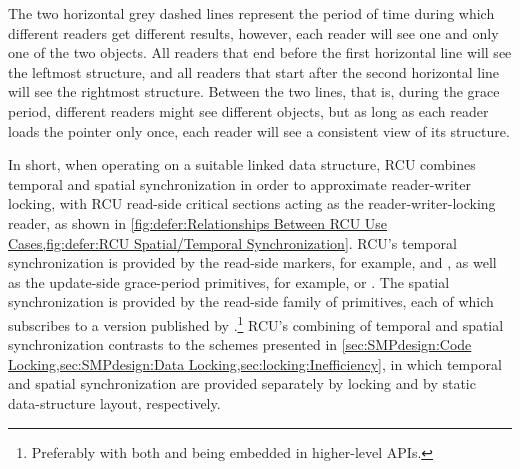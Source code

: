 The two horizontal grey dashed lines represent the period of time during
which different readers get different results, however, each reader
will see one and only one of the two objects.
All readers that end before the first horizontal line will see the
leftmost  structure, and all readers that start after the
second horizontal line will see the rightmost structure.
Between the two lines, that is, during the grace period, different
readers might see different objects, but as long as each reader
loads the  pointer only once, each reader will see
a consistent view of its  structure.

\QuickQuizEnd

In short, when operating on a suitable linked data structure, RCU
combines temporal and spatial synchronization in order to approximate
reader-writer locking, with RCU read-side critical sections acting as
the reader-writer-locking reader, as shown in
\cref{fig:defer:Relationships Between RCU Use Cases,fig:defer:RCU Spatial/Temporal Synchronization}.
RCU's temporal synchronization is provided by the read-side markers,
for example,  and , as well as
the update-side grace-period primitives, for example, 
or .
The spatial synchronization is provided by the read-side
 family of primitives, each of which subscribes
to a version published by .\footnote{
	Preferably with both  and
	 being embedded in higher-level APIs.}
RCU's combining of temporal and spatial synchronization contrasts to
the schemes presented in
\cref{sec:SMPdesign:Code Locking,sec:SMPdesign:Data Locking,sec:locking:Inefficiency},
in which temporal and spatial synchronization are provided separately by
locking and by static data-structure layout, respectively.

